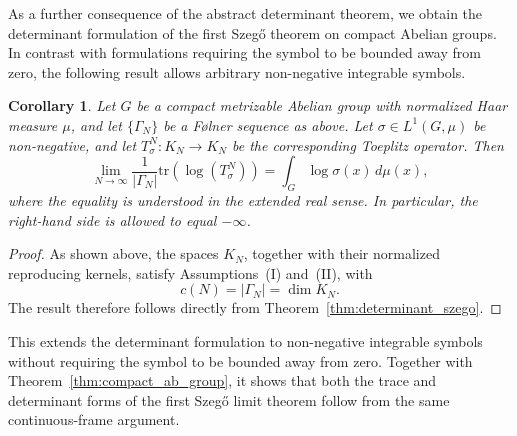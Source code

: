 \documentclass{amsart}
\newtheorem{cor}[thm]{Corollary}
\theoremstyle{definition}
\theoremstyle{remark}
\numberwithin{equation}{section}
\begin{document}
As a further consequence of the abstract determinant theorem, we obtain
the determinant formulation of the first Szeg\H{o} theorem on compact
Abelian groups.  In contrast with formulations requiring the symbol to
be bounded away from zero, the following result allows arbitrary
non-negative integrable symbols.

\begin{cor}\label{DetGroup}
Let $G$ be a compact metrizable Abelian group with normalized Haar measure $\mu$,
and let $\{\Gamma_N\}$ be a F{\o}lner sequence as above.  Let
$\sigma\in L^1(G,\mu)$ be non-negative, and let
$T_\sigma^N:K_N\to K_N$ be the corresponding Toeplitz operator.  Then
\[
    \lim_{N\to\infty}
    \frac{1}{|\Gamma_N|}
    \text{tr}\left(\log\left( T_\sigma^N\right)\right)
    =
    \int_G \log\sigma(x)\,d\mu(x),
\]
where the equality is understood in the extended real sense.  In
particular, the right-hand side is allowed to equal $-\infty$.
\end{cor}

\begin{proof}
As shown above, the spaces $K_N$, together with their normalized
reproducing kernels, satisfy Assumptions~(I) and~(II), with
\[
    c(N)=|\Gamma_N|=\dim K_N.
\]
The result therefore follows directly from Theorem~\ref{thm:determinant_szego}.
\end{proof}

This extends the determinant formulation to non-negative integrable
symbols without requiring the symbol to be bounded away from zero.
Together with Theorem~\ref{thm:compact_ab_group}, it shows that both the trace and determinant
forms of the first Szeg\H{o} limit theorem follow from the same
continuous-frame argument.
\end{document}
